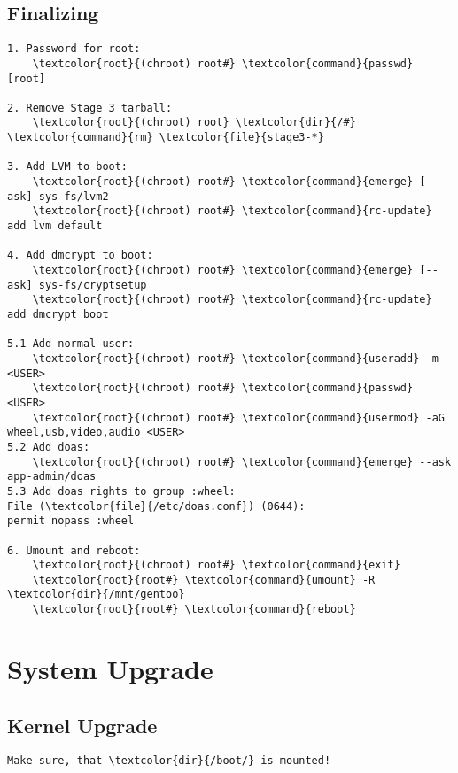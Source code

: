 \documentclass[10pt, a4paper, onecolumn, openany]{book}         %
\begin{document}
\section{Finalizing}
\begin{Verbatim}[commandchars=\\\{\}]
1. Password for root:
    \textcolor{root}{(chroot) root#} \textcolor{command}{passwd}  [root]

2. Remove Stage 3 tarball:
    \textcolor{root}{(chroot) root} \textcolor{dir}{/#} \textcolor{command}{rm} \textcolor{file}{stage3-*}

3. Add LVM to boot:
    \textcolor{root}{(chroot) root#} \textcolor{command}{emerge} [--ask] sys-fs/lvm2
    \textcolor{root}{(chroot) root#} \textcolor{command}{rc-update} add lvm default

4. Add dmcrypt to boot:
    \textcolor{root}{(chroot) root#} \textcolor{command}{emerge} [--ask] sys-fs/cryptsetup 
    \textcolor{root}{(chroot) root#} \textcolor{command}{rc-update} add dmcrypt boot
 
5.1 Add normal user:
    \textcolor{root}{(chroot) root#} \textcolor{command}{useradd} -m <USER>
    \textcolor{root}{(chroot) root#} \textcolor{command}{passwd} <USER>
    \textcolor{root}{(chroot) root#} \textcolor{command}{usermod} -aG wheel,usb,video,audio <USER>
5.2 Add doas:
    \textcolor{root}{(chroot) root#} \textcolor{command}{emerge} --ask app-admin/doas
5.3 Add doas rights to group :wheel:
File (\textcolor{file}{/etc/doas.conf}) (0644):
permit nopass :wheel    
    
6. Umount and reboot:
    \textcolor{root}{(chroot) root#} \textcolor{command}{exit}
    \textcolor{root}{root#} \textcolor{command}{umount} -R \textcolor{dir}{/mnt/gentoo}
    \textcolor{root}{root#} \textcolor{command}{reboot}
\end{Verbatim}


\chapter{System Upgrade}%
\section{Kernel Upgrade}
\begin{Verbatim}[commandchars=\\\{\}]
Make sure, that \textcolor{dir}{/boot/} is mounted!
\end{Verbatim}
\end{document}
